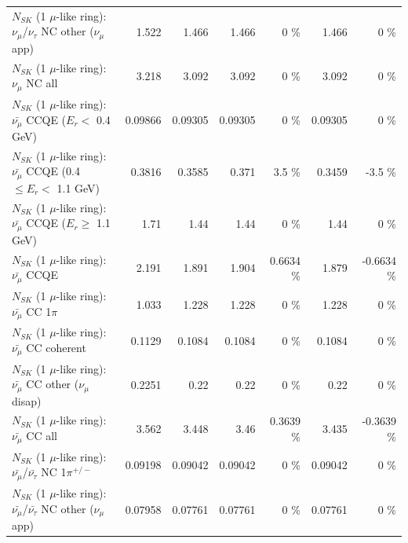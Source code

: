 \begin{table}
\begin{tabular}{| l | r | r | r  r | r  r |}
     $N_{SK}$ (1 $\mu$-like ring): $\nu_\mu$/$\nu_\tau$ NC other ($\nu_\mu$ app) &           1.522 &           1.466 &           1.466 &        0 \%  &           1.466 &        0 \%  \\ 
                                $N_{SK}$ (1 $\mu$-like ring): $\nu_{\mu}$ NC all &           3.218 &           3.092 &           3.092 &        0 \%  &           3.092 &        0 \%  \\ 
\hline
\hline
\hline
          $N_{SK}$ (1 $\mu$-like ring): $\bar{\nu_\mu}$ CCQE ($E_{r} <$ 0.4 GeV) &         0.09866 &         0.09305 &         0.09305 &        0 \%  &         0.09305 &        0 \%  \\ 
 $N_{SK}$ (1 $\mu$-like ring): $\bar{\nu_\mu}$ CCQE (0.4 $\leq E_{r} <$ 1.1 GeV) &          0.3816 &          0.3585 &           0.371 &      3.5 \%  &          0.3459 &     -3.5 \%  \\ 
       $N_{SK}$ (1 $\mu$-like ring): $\bar{\nu_\mu}$ CCQE ($E_{r} \geq$ 1.1 GeV) &            1.71 &            1.44 &            1.44 &        0 \%  &            1.44 &        0 \%  \\ 
\hline
                              $N_{SK}$ (1 $\mu$-like ring): $\bar{\nu_\mu}$ CCQE &           2.191 &           1.891 &           1.904 &   0.6634 \%  &           1.879 &  -0.6634 \%  \\ 
                         $N_{SK}$ (1 $\mu$-like ring): $\bar{\nu_\mu}$ CC 1$\pi$ &           1.033 &           1.228 &           1.228 &        0 \%  &           1.228 &        0 \%  \\ 
                       $N_{SK}$ (1 $\mu$-like ring): $\bar{\nu_\mu}$ CC coherent &          0.1129 &          0.1084 &          0.1084 &        0 \%  &          0.1084 &        0 \%  \\ 
        $N_{SK}$ (1 $\mu$-like ring): $\bar{\nu_\mu}$ CC other ($\nu_\mu$ disap) &          0.2251 &            0.22 &            0.22 &        0 \%  &            0.22 &        0 \%  \\ 
                          $N_{SK}$ (1 $\mu$-like ring): $\bar{\nu_{\mu}}$ CC all &           3.562 &           3.448 &            3.46 &   0.3639 \%  &           3.435 &  -0.3639 \%  \\ 
\hline
  $N_{SK}$ (1 $\mu$-like ring): $\bar{\nu_\mu}$/$\bar{\nu_\tau}$ NC 1$\pi^{+/-}$ &         0.09198 &         0.09042 &         0.09042 &        0 \%  &         0.09042 &        0 \%  \\ 
$N_{SK}$ (1 $\mu$-like ring): $\bar{\nu_\mu}$/$\bar{\nu_\tau}$ NC other ($\nu_\mu$ app) &         0.07958 &         0.07761 &         0.07761 &        0 \%  &         0.07761 &        0 \%  \\ 

\end{tabular}
\end{table}
